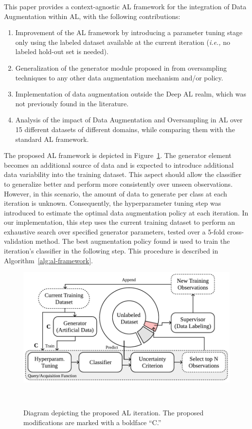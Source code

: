 \documentclass[parskip=full]{scrartcl}
\begin{document}
This paper provides a context-agnostic AL framework for the integration of
Data Augmentation within AL, with the following contributions:

\begin{enumerate}
    \item Improvement of the AL framework by introducing a parameter tuning
        stage only using the labeled dataset available at the current
        iteration (\textit{i.e.,} no labeled hold-out set is needed).
    \item Generalization of the generator module proposed in
        \cite{Fonseca2021} from oversampling techniques to any other data
        augmentation mechanism and/or policy.
    \item Implementation of data augmentation outside the Deep AL realm, which
        was not previously found in the literature.
    \item Analysis of the impact of Data Augmentation and Oversampling in AL
        over 15 different datasets of different domains, while comparing them
        with the standard AL framework.
\end{enumerate}

The proposed AL framework is depicted in Figure~\ref{fig:al_proposed}. The
generator element becomes an additional source of data and is expected to
introduce additional data variability into the training dataset. This aspect
should allow the classifier to generalize better and perform more consistently
over unseen observations. However, in this scenario, the amount of data to
generate per class at each iteration is unknown. Consequently, the
hyperparameter tuning step was introduced to estimate the optimal data
augmentation policy at each iteration. In our implementation, this step uses
the current training dataset to perform an exhaustive search over specified
generator parameters, tested over a 5-fold cross-validation method. The best
augmentation policy found is used to train the iteration's classifier in the
following step. This procedure is described in
Algorithm~\ref{alg:al-framework}.


\begin{figure}
	\centering
	\includegraphics[width=.6\linewidth]{../analysis/al_proposed}
    \caption{%
        Diagram depicting the proposed AL iteration. The proposed
        modifications are marked with a boldface ``C.''
    }~\label{fig:al_proposed}
\end{figure}
\end{document}
